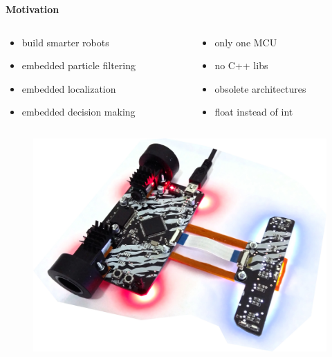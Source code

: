 \documentclass[xcolor=dvipsnames]{beamer}
\begin{document}
\begin{frame}{\bf Motivation}


\begin{columns}
\begin{column}{0.5\textwidth}

\begin{itemize}
  \item build smarter robots
  \item embedded particle filtering
  \item embedded localization
  \item embedded decision making
\end{itemize}

\end{column}
\begin{column}{0.5\textwidth}  %

\begin{itemize}
  \color{red}
  \item only one MCU
  \item no C++ libs
  \item obsolete architectures
  \item float instead of int
\end{itemize}

\end{column}
\end{columns}


  \begin{figure}
    \includegraphics[scale=0.07]{../../pictures/robot_ascender.jpg}
  \end{figure}


\end{frame}
\end{document}
